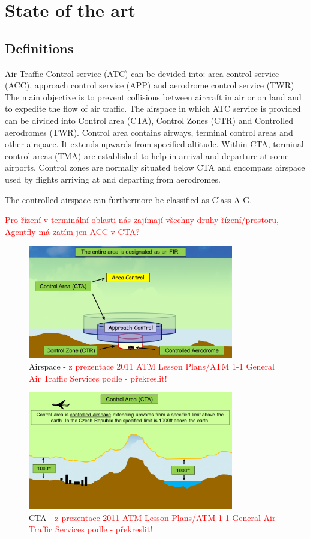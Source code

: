 \chapter{State of the art}
\section{Definitions}

Air Traffic Control service (ATC) can be devided into: area control service (ACC), approach control service (APP) and aerodrome control service (TWR) \cite[Chapter 1]{ICAO2007} The main objective is to prevent collisions between aircraft in air or on land and to expedite the flow of air traffic. \cite[Chapter 2.2]{annex11}
The airspace in which ATC service is provided can be divided into Control area (CTA), Control Zones (CTR) and Controlled aerodromes (TWR). Control area contains airways, terminal control areas and other airspace. It extends upwards from specified altitude. Within CTA, terminal control areas (TMA) are established to help in arrival and departure at some airports.
Control zones are normally situated below CTA and encompass airspace used by flights arriving at and departing from aerodromes.

The controlled airspace can furthermore be classified as Class A-G. \cite[\textcolor{red}{ref na nolana}]{NOLAN}

\textcolor{red}{Pro řízení v terminální oblasti nás zajímají všechny druhy řízení/prostoru, Agentfly má zatím jen ACC v CTA?}

\begin{figure}[h]
    \centering
    \includegraphics[width=0.8\textwidth]{figures/airspace.png}
    \caption{Airspace - \textcolor{red}{z prezentace 2011 ATM Lesson Plans/ATM 1-1 General Air Traffic Services podle \cite[Chapter 2.5]{annex11} - překreslit!}}
    \label{fig:airspace}
\end{figure}

\begin{figure}[h]
    \centering
    \includegraphics[width=0.8\textwidth]{figures/cta.png}
    \caption{CTA - \textcolor{red}{z prezentace 2011 ATM Lesson Plans/ATM 1-1 General Air Traffic Services podle \cite[Chapter 2.10]{annex11} - překreslit!}}
    \label{fig:airspace}
\end{figure}